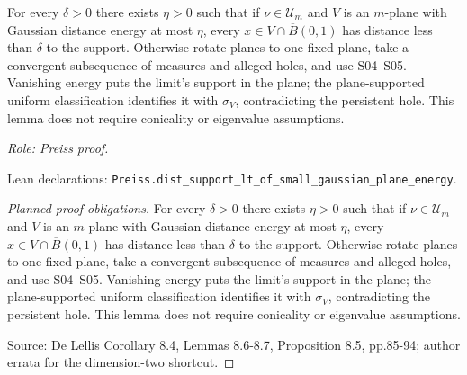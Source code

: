 \begin{lemma}
\label{lem:small-energy-no-holes}




For every $\delta>0$ there exists $\eta>0$ such that if $\nu\in\mathcal U_m$
and $V$ is an $m$-plane with Gaussian distance energy at most $\eta$, every
$x\in V\cap\overline B(0,1)$ has distance less than $\delta$ to the support.
Otherwise rotate planes to one fixed plane, take a convergent subsequence of
measures and alleged holes, and use S04--S05. Vanishing energy puts the limit's
support in the plane; the plane-supported uniform classification identifies it
with $\sigma_V$, contradicting the persistent hole. This lemma does not
require conicality or eigenvalue assumptions.
\par\emph{Role: Preiss proof.}
\par Lean declarations: \texttt{Preiss.dist\_support\_lt\_of\_small\_gaussian\_plane\_energy}.
\end{lemma}
\begin{proof}[Planned proof obligations]

For every $\delta>0$ there exists $\eta>0$ such that if $\nu\in\mathcal U_m$
and $V$ is an $m$-plane with Gaussian distance energy at most $\eta$, every
$x\in V\cap\overline B(0,1)$ has distance less than $\delta$ to the support.
Otherwise rotate planes to one fixed plane, take a convergent subsequence of
measures and alleged holes, and use S04--S05. Vanishing energy puts the limit's
support in the plane; the plane-supported uniform classification identifies it
with $\sigma_V$, contradicting the persistent hole. This lemma does not
require conicality or eigenvalue assumptions.
\par Source: De Lellis Corollary 8.4, Lemmas 8.6-8.7, Proposition 8.5, pp.85-94; author errata for the dimension-two shortcut.
\end{proof}

